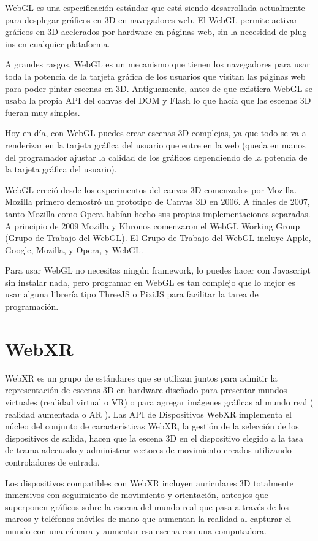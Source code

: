\documentclass[a4paper, 12pt]{book}
\begin{document}
WebGL es una especificación estándar que está siendo desarrollada actualmente para desplegar gráficos en 3D en navegadores web. El WebGL permite activar gráficos en 3D acelerados por hardware en páginas web, sin la necesidad de plug-ins en cualquier plataforma.

A grandes rasgos, WebGL es un mecanismo que tienen los navegadores para usar toda la potencia de la tarjeta gráfica de los usuarios que visitan las páginas web para poder pintar escenas en 3D.
Antiguamente, antes de que existiera WebGL se usaba la propia API del canvas del DOM y Flash lo que hacía que las escenas 3D fueran muy simples.

Hoy en día, con WebGL puedes crear escenas 3D complejas, ya que todo se va a renderizar en la tarjeta gráfica del usuario que entre en la web (queda en manos del programador ajustar la calidad de los gráficos dependiendo de la potencia de la tarjeta gráfica del usuario).

WebGL creció desde los experimentos del canvas 3D comenzados por Mozilla. Mozilla primero demostró un prototipo de Canvas 3D en 2006. A finales de 2007, tanto Mozilla como Opera habían hecho sus propias implementaciones separadas. A principio de 2009 Mozilla y Khronos comenzaron el WebGL Working Group (Grupo de Trabajo del WebGL). El Grupo de Trabajo del WebGL incluye Apple, Google, Mozilla, y Opera, y WebGL.

Para usar WebGL no necesitas ningún framework, lo puedes hacer con Javascript sin instalar nada, pero programar en WebGL es tan complejo que lo mejor es usar alguna librería tipo ThreeJS o PixiJS para facilitar la tarea de programación.

\newpage
\section{WebXR} 
\label{sec:WebXR}
WebXR  es un grupo de estándares que se utilizan juntos para admitir la representación de escenas 3D en hardware diseñado para presentar mundos virtuales (realidad virtual o  VR) o para agregar imágenes gráficas al mundo real ( realidad aumentada o  AR ).  Las  API de Dispositivos WebXR implementa el núcleo del conjunto de características WebXR, la gestión de la selección de los dispositivos de salida, hacen que la escena 3D en el dispositivo elegido a la tasa de trama adecuado y administrar vectores de movimiento creados utilizando controladores de entrada.

Los dispositivos compatibles con WebXR incluyen auriculares 3D totalmente inmersivos con seguimiento de movimiento y orientación, anteojos que superponen gráficos sobre la escena del mundo real que pasa a través de los marcos y teléfonos móviles de mano que aumentan la realidad al capturar el mundo con una cámara y aumentar esa escena con una computadora. 
\end{document}
